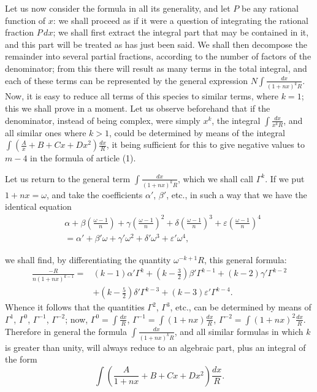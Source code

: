 \documentclass{article}
\begin{document}
Let us now consider the formula in all its generality, and let $P$ be any rational function of $x$: we shall proceed as if it were a question of integrating the rational fraction $P\,dx$; we shall first extract the integral part that may be contained in it, and this part will be treated as has just been said. We shall then decompose the remainder into several partial fractions, according to the number of factors of the denominator; from this there will result as many terms in the total integral, and each of these terms can be represented by the general expression $\displaystyle N\int\frac{dx}{(1+nx)^{k}R}$. Now, it is easy to reduce all terms of this species to similar terms, where $k=1$; this we shall prove in a moment. Let us observe beforehand that if the denominator, instead of being complex, were simply $x^{k}$, the integral $\displaystyle\int\frac{dx}{x^{k}R}$, and all similar ones where $k>1$, could be determined by means of the integral $\displaystyle\int\left(\frac{A}{x}+B+Cx+Dx^{2}\right)\frac{dx}{R}$, it being sufficient for this to give negative values to $m-4$ in the formula of article (1).

Let us return to the general term $\displaystyle\int\frac{dx}{(1+nx)^{k}R}$, which we shall call $\Gamma^{k}$. If we put $1+nx=\omega$, and take the coefficients $\alpha'$, $\beta'$, etc., in such a way that we have the identical equation
\[ \begin{aligned} &\alpha+\beta\left(\frac{\omega-1}{n}\right)+\gamma\left(\frac{\omega-1}{n}\right)^{2}+\delta\left(\frac{\omega-1}{n}\right)^{3}+\varepsilon\left(\frac{\omega-1}{n}\right)^{4}\\ &=\alpha'+\beta'\omega+\gamma'\omega^{2}+\delta'\omega^{3}+\varepsilon'\omega^{4}, \end{aligned} \]

we shall find, by differentiating the quantity $\omega^{-k+1}R$, this general formula:
\[ \begin{aligned} \frac{-R}{n(1+nx)^{k-1}}={}&(k-1)\alpha'\Gamma^{k}+(k-\tfrac{3}{2})\beta'\Gamma^{k-1}+(k-2)\gamma'\Gamma^{k-2}\\ &+(k-\tfrac{5}{2})\delta'\Gamma^{k-3}+(k-3)\varepsilon'\Gamma^{k-4}. \end{aligned} \]
Whence it follows that the quantities $\Gamma^{2}$, $\Gamma^{3}$, etc., can be determined by means of $\Gamma^{1}$, $\Gamma^{0}$, $\Gamma^{-1}$, $\Gamma^{-2}$; now, $\displaystyle\Gamma^{0}=\int\frac{dx}{R}$, $\displaystyle\Gamma^{-1}=\int(1+nx)\frac{dx}{R}$, $\displaystyle\Gamma^{-2}=\int(1+nx)^{2}\frac{dx}{R}$. Therefore in general the formula $\displaystyle\int\frac{dx}{(1+nx)^{k}R}$, and all similar formulas in which $k$ is greater than unity, will always reduce to an algebraic part, plus an integral of the form
\[ \int\left(\frac{A}{1+nx}+B+Cx+Dx^{2}\right)\frac{dx}{R}. \]
\end{document}
